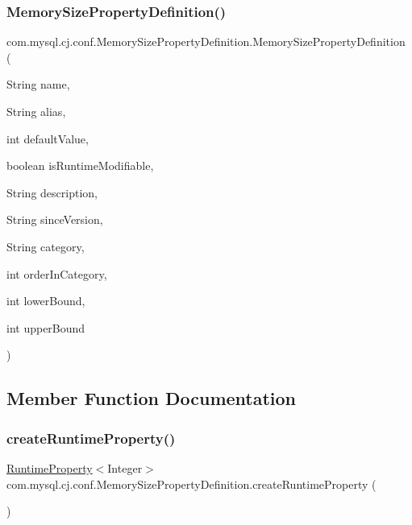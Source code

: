 \subsubsection{\texorpdfstring{Memory\+Size\+Property\+Definition()}{MemorySizePropertyDefinition()}\hspace{0.1cm}{\footnotesize\ttfamily [2/2]}}
{\footnotesize\ttfamily com.\+mysql.\+cj.\+conf.\+Memory\+Size\+Property\+Definition.\+Memory\+Size\+Property\+Definition (\begin{DoxyParamCaption}\item[{String}]{name,  }\item[{String}]{alias,  }\item[{int}]{default\+Value,  }\item[{boolean}]{is\+Runtime\+Modifiable,  }\item[{String}]{description,  }\item[{String}]{since\+Version,  }\item[{String}]{category,  }\item[{int}]{order\+In\+Category,  }\item[{int}]{lower\+Bound,  }\item[{int}]{upper\+Bound }\end{DoxyParamCaption})}



\subsection{Member Function Documentation}
\mbox{\label{classcom_1_1mysql_1_1cj_1_1conf_1_1_memory_size_property_definition_af5bd3b81a694d07152eb314e85a7015b}} 
\subsubsection{\texorpdfstring{create\+Runtime\+Property()}{createRuntimeProperty()}}
{\footnotesize\ttfamily \mbox{\hyperlink{interfacecom_1_1mysql_1_1cj_1_1conf_1_1_runtime_property}{Runtime\+Property}}$<$Integer$>$ com.\+mysql.\+cj.\+conf.\+Memory\+Size\+Property\+Definition.\+create\+Runtime\+Property (\begin{DoxyParamCaption}{ }\end{DoxyParamCaption})}

